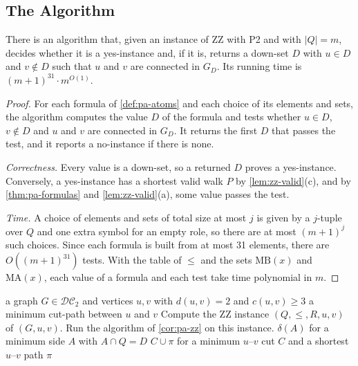 \documentclass[pdflatex,sn-mathphys-num]{sn-jnl}%
\theoremstyle{thmstyleone}%
\theoremstyle{thmstyletwo}%
\theoremstyle{thmstylethree}%
\newcommand{\DC}{\mathcal{DC}_2}%
\newcommand{\MB}{\mathrm{MB}}%
\newcommand{\MA}{\mathrm{MA}}%
\begin{document}
\subsection{The Algorithm}
\label{sec:pa-algorithm}

\begin{corollary}
\label{cor:pa-zz}
There is an algorithm that, given an instance of ZZ with P2 and with $|Q| = m$, decides whether it is a yes-instance and, if it is, returns a down-set $D$ with $u \in D$ and $v \notin D$ such that $u$ and $v$ are connected in $G_D$.
Its running time is $(m + 1)^{31} \cdot m^{O(1)}$.
\end{corollary}

\begin{proof}
For each formula of \cref{def:pa-atoms} and each choice of its elements and sets, the algorithm computes the value $D$ of the formula and tests whether $u \in D$, $v \notin D$ and $u$ and $v$ are connected in $G_D$.
It returns the first $D$ that passes the test, and it reports a no-instance if there is none.

\emph{Correctness.}
Every value is a down-set, so a returned $D$ proves a yes-instance.
Conversely, a yes-instance has a shortest valid walk $P$ by \cref{lem:zz-valid}(c), and by \cref{thm:pa-formulas} and \cref{lem:zz-valid}(a), some value passes the test.

\emph{Time.}
A choice of elements and sets of total size at most $j$ is given by a $j$-tuple over $Q$ and one extra symbol for an empty role, so there are at most $(m + 1)^j$ such choices.
Since each formula is built from at most 31 elements, there are $O((m + 1)^{31})$ tests.
With the table of $\leq$ and the sets $\MB(x)$ and $\MA(x)$, each value of a formula and each test take time polynomial in $m$.
\end{proof}

\begin{algorithm}[tb]
\caption{A minimum cut-path for an instance $(G, u, v)$ of the open case}
\label{alg:pa-open-case}
\begin{algorithmic}[1]
\Require a graph $G \in \DC$ and vertices $u, v$ with $d(u, v) = 2$ and $c(u, v) \geq 3$
\Ensure a minimum cut-path between $u$ and $v$
\State Compute the ZZ instance $(Q, \leq, R, u, v)$ of $(G, u, v)$.
\State Run the algorithm of \cref{cor:pa-zz} on this instance.
\State \Return $\delta(A)$ for a minimum side $A$ with $A \cap Q = D$
\Else
\State \Return $C \cup \pi$ for a minimum $u$--$v$ cut $C$ and a shortest $u$--$v$ path $\pi$
\EndIf
\end{algorithmic}
\end{algorithm}
\end{document}
